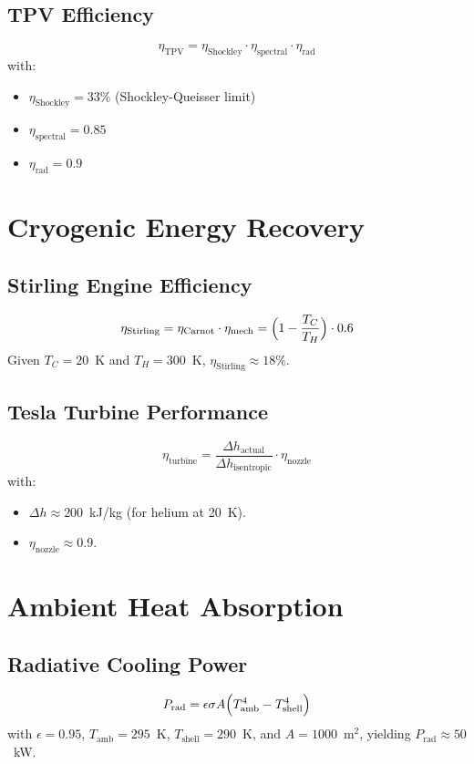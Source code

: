 \documentclass[12pt]{article}
\begin{document}
\subsection{TPV Efficiency}
\begin{equation}
    \eta_{\text{TPV}} = \eta_{\text{Shockley}} \cdot \eta_{\text{spectral}} \cdot \eta_{\text{rad}}
\end{equation}
with:
\begin{itemize}
    \item $\eta_{\text{Shockley}} = 33\%$ (Shockley-Queisser limit)
    \item $\eta_{\text{spectral}} = 0.85$
    \item $\eta_{\text{rad}} = 0.9$
\end{itemize}

\section{Cryogenic Energy Recovery}
\subsection{Stirling Engine Efficiency}
\begin{equation}
    \eta_{\text{Stirling}} = \eta_{\text{Carnot}} \cdot \eta_{\text{mech}} = \Bigl(1 - \frac{T_C}{T_H}\Bigr) \cdot 0.6
\end{equation}
Given $T_C = 20$~K and $T_H = 300$~K, $\eta_{\text{Stirling}} \approx 18\%$.

\subsection{Tesla Turbine Performance}
\begin{equation}
    \eta_{\text{turbine}} = \frac{\Delta h_{\text{actual}}}{\Delta h_{\text{isentropic}}} \cdot \eta_{\text{nozzle}}
\end{equation}
with:
\begin{itemize}
    \item $\Delta h \approx 200$~kJ/kg (for helium at 20~K).
    \item $\eta_{\text{nozzle}} \approx 0.9$.
\end{itemize}

\section{Ambient Heat Absorption}
\subsection{Radiative Cooling Power}
\begin{equation}
    P_{\text{rad}} = \epsilon \sigma A \Bigl(T_{\text{amb}}^4 - T_{\text{shell}}^4\Bigr)
\end{equation}
with $\epsilon = 0.95$, $T_{\text{amb}} = 295$~K, $T_{\text{shell}} = 290$~K, and $A = 1000$~m$^2$, yielding $P_{\text{rad}} \approx 50$~kW.
\end{document}
